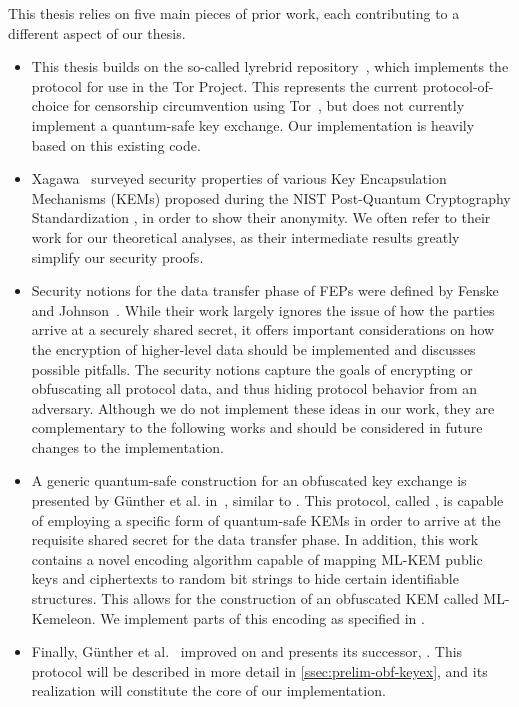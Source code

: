 This thesis relies on five main pieces of prior work, each contributing to a different aspect of our thesis.
\begin{itemize}
    \item This thesis builds on the so-called lyrebrid repository~\cite{lyrebird}, which implements the \obfsfour{} protocol for use in the Tor Project. This represents the current protocol-of-choice for censorship circumvention using Tor~\cite{tor-pt-recommendations,tor-bridge-setup}, but does not currently implement a quantum-safe key exchange. Our implementation is heavily based on this existing code.

    \item Xagawa~\cite{EC:Xagawa22} surveyed security properties of various Key Encapsulation Mechanisms (KEMs) proposed during the NIST Post-Quantum Cryptography Standardization \cite{nist-standardization}, in order to show their anonymity. We often refer to their work for our theoretical analyses, as their intermediate results greatly simplify our security proofs.

    \item Security notions for the data transfer phase of FEPs were defined by Fenske and Johnson~\cite{CCS:FenJoh24}. While their work largely ignores the issue of how the parties arrive at a securely shared secret, it offers important considerations on how the encryption of higher-level data should be implemented and discusses possible pitfalls. The security notions capture the goals of encrypting or obfuscating all protocol data, and thus hiding protocol behavior from an adversary.
    Although we do not implement these ideas in our work, they are complementary to the following works and should be considered in future changes to the implementation.

    \item A generic quantum-safe construction for an obfuscated key exchange is presented by Günther et al. in~\cite{CCS:GunSteVei24}, similar to \obfsfour{}. This protocol, called \pqobfs{}, is capable of employing a specific form of quantum-safe KEMs in order to arrive at the requisite shared secret for the data transfer phase.
    In addition, this work contains a novel encoding algorithm capable of mapping ML-KEM public keys and ciphertexts to random bit strings to hide certain identifiable structures. This allows for the construction of an obfuscated KEM called ML-Kemeleon. We implement parts of this encoding as specified in \cite{irtf-cfrg-kemeleon-00}. 

    \item Finally, Günther et al.~\cite{EPRINT:GRSV25} improved on \pqobfs{} and presents its successor, \drivel{}. This protocol will be described in more detail in \cref{ssec:prelim-obf-keyex}, and its realization will constitute the core of our implementation.
\end{itemize}
